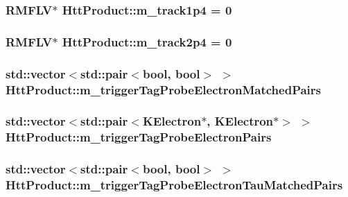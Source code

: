 \label{classHttProduct_ad59601b3ebee99a873ca371e79cbd1c4}
\hypertarget{classHttProduct_a6316ad75d22057f3a6405904144e3307}{
\subsubsection[{m\_\-track1p4}]{\setlength{\rightskip}{0pt plus 5cm}RMFLV$\ast$ {\bf HttProduct::m\_\-track1p4} = 0}}
\label{classHttProduct_a6316ad75d22057f3a6405904144e3307}
\hypertarget{classHttProduct_a8a6f0088a1ba7e9838e0b2f9b551bce5}{
\subsubsection[{m\_\-track2p4}]{\setlength{\rightskip}{0pt plus 5cm}RMFLV$\ast$ {\bf HttProduct::m\_\-track2p4} = 0}}
\label{classHttProduct_a8a6f0088a1ba7e9838e0b2f9b551bce5}
\hypertarget{classHttProduct_a165cea4e5d0a8f8ef984c4ce4ffeb125}{
\subsubsection[{m\_\-triggerTagProbeElectronMatchedPairs}]{\setlength{\rightskip}{0pt plus 5cm}std::vector$<$std::pair$<$bool, bool$>$ $>$ {\bf HttProduct::m\_\-triggerTagProbeElectronMatchedPairs}}}
\label{classHttProduct_a165cea4e5d0a8f8ef984c4ce4ffeb125}
\hypertarget{classHttProduct_a4593cae98fab3011e52bf798ff266e75}{
\subsubsection[{m\_\-triggerTagProbeElectronPairs}]{\setlength{\rightskip}{0pt plus 5cm}std::vector$<$std::pair$<$KElectron$\ast$, KElectron$\ast$$>$ $>$ {\bf HttProduct::m\_\-triggerTagProbeElectronPairs}}}
\label{classHttProduct_a4593cae98fab3011e52bf798ff266e75}
\hypertarget{classHttProduct_acfac99f7abceb758f67853389752d1fb}{
\subsubsection[{m\_\-triggerTagProbeElectronTauMatchedPairs}]{\setlength{\rightskip}{0pt plus 5cm}std::vector$<$std::pair$<$bool, bool$>$ $>$ {\bf HttProduct::m\_\-triggerTagProbeElectronTauMatchedPairs}}}
